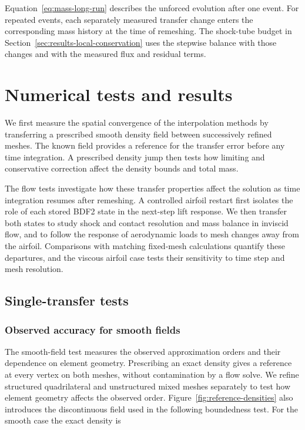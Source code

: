 \documentclass[a4paper,fleqn]{cas-sc}
\begin{document}
Equation~\eqref{eq:mass-long-run} describes the unforced evolution after one event. For repeated events, each separately measured transfer change enters the corresponding mass history at the time of remeshing. The shock-tube budget in Section~\ref{sec:results-local-conservation} uses the stepwise balance with those changes and with the measured flux and residual terms.

\section{Numerical tests and results}
\label{sec:methodology}
\label{sec:results}

We first measure the spatial convergence of the interpolation methods by transferring a prescribed smooth density field between successively refined meshes. The known field provides a reference for the transfer error before any time integration. A prescribed density jump then tests how limiting and conservative correction affect the density bounds and total mass.

The flow tests investigate how these transfer properties affect the solution as time integration resumes after remeshing. A controlled airfoil restart first isolates the role of each stored BDF2 state in the next-step lift response. We then transfer both states to study shock and contact resolution and mass balance in inviscid flow, and to follow the response of aerodynamic loads to mesh changes away from the airfoil. Comparisons with matching fixed-mesh calculations quantify these departures, and the viscous airfoil case tests their sensitivity to time step and mesh resolution.

\subsection{Single-transfer tests}
\label{sec:static-verification}

\subsubsection{Observed accuracy for smooth fields}

The smooth-field test measures the observed approximation orders and their dependence on element geometry. Prescribing an exact density gives a reference at every vertex on both meshes, without contamination by a flow solve. We refine structured quadrilateral and unstructured mixed meshes separately to test how element geometry affects the observed order. Figure~\ref{fig:reference-densities} also introduces the discontinuous field used in the following boundedness test. For the smooth case the exact density is
\end{document}
